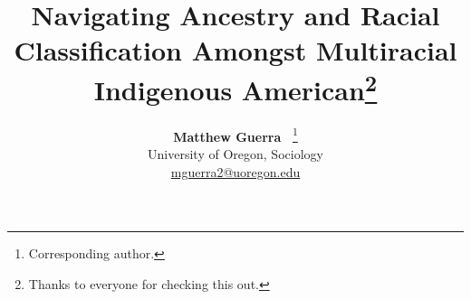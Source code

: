 \documentclass[
  12pt,
  letterpaper,
]{article}
\title{Navigating Ancestry and Racial Classification Amongst Multiracial
Indigenous American\thanks{Thanks to everyone for checking this out.}}
\author{
{\bfseries \normalsize Matthew Guerra~\orcidlink{0009-0003-2658-442X}}%
\thanks{Corresponding author.} \\%
 \small University of Oregon, Sociology \\%
{\footnotesize \url{mguerra2@uoregon.edu}} \\\vspace{10pt}
}
\date{}
\newenvironment{keywords}
{\small\sffamily{\sffamily\small\bfseries{Keywords.}}}
\begin{document}
\renewcommand{\abstractname}{Abstract.}


\maketitle
\begin{abstract}
Current research on race and multiracial individuals recognizes that
Indigenous racial identity is fluid and often contested. Using a
settler-colonial theoretical framework and the recommendations of
QuantCrit literature, this research project expands understanding of
multi-racial Indigenous identity and demonstrates how ancestry
influences racial ``decision-making'' for Indigenous Americans. By
leveraging data from the American Community Survey (ACS) from 2010 to
2020, the relationship between an individuals reported ancestry and
their self-identified racial classification is investigated by
estimating multinomial logistic regression models. The results indicate
the relationship between various predictorss, and a persons likelihood
to identify as Indigenous alone, multi-racial, or to distance themself
from their Indigenous ancestry and identity in favor of their other
racial identity. When these findings are evaluated within the context of
settler-colonialism, many previously confounding findings can be linked
to the social reality that respondents navigate as Indigenous Americans.
\end{abstract}
\begin{keywords}
\def\sep{;\ }
Indigenous identity\sep multiracial studies\sep ancestry\sep racial
decision-making\sep racial
classification\sep settler-colonialism\sep QuantCrit\sep 
American Community Survey
\end{keywords}

\subsection{Introduction}\label{introduction}
\end{document}
